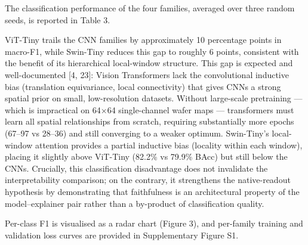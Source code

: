 \documentclass[11pt,a4paper]{article}
\begin{document}
The classification performance of the four families, averaged over three random seeds, is reported in Table 3.

\begin{table}[htbp]
\centering
\small
\caption{\textbf{Table 3.} Classification performance (mean $\pm$ std across 3 seeds)}
\end{table}

ViT-Tiny trails the CNN families by approximately 10 percentage points in macro-F1, while Swin-Tiny reduces this gap to roughly 6 points, consistent with the benefit of its hierarchical local-window structure. This gap is expected and well-documented [4, 23]: Vision Transformers lack the convolutional inductive bias (translation equivariance, local connectivity) that gives CNNs a strong spatial prior on small, low-resolution datasets. Without large-scale pretraining --- which is impractical on 64$\times$64 single-channel wafer maps --- transformers must learn all spatial relationships from scratch, requiring substantially more epochs (67--97 vs 28--36) and still converging to a weaker optimum. Swin-Tiny's local-window attention provides a partial inductive bias (locality within each window), placing it slightly above ViT-Tiny (82.2\% vs 79.9\% BAcc) but still below the CNNs. Crucially,
this classification disadvantage does not invalidate the interpretability comparison; on the contrary, it strengthens the native-readout hypothesis by demonstrating that faithfulness is an architectural property of the model--explainer pair rather than a by-product of classification quality.

Per-class F1 is visualised as a radar chart (Figure 3), and per-family training and validation loss curves are provided in Supplementary Figure S1.
\end{document}
